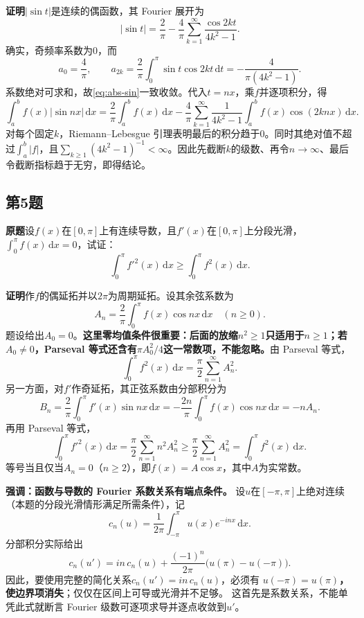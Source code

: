 \documentclass[11pt,a4paper]{ctexart}
\newcommand{\dd}{\,\mathrm d}
\newcommand{\proofstart}{\par\noindent\textbf{证明}\quad}
\begin{document}
\proofstart $|\sin t|$是连续的偶函数，其 Fourier 展开为
\begin{equation}\label{eq:abs-sin}
 |\sin t|=\frac2\pi-\frac4\pi
 \sum_{k=1}^{\infty}\frac{\cos2kt}{4k^2-1}.
\end{equation}
确实，奇频率系数为$0$，而
\[
 a_0=\frac4\pi,\qquad
 a_{2k}=\frac2\pi\int_0^\pi\sin t\cos2kt\dd t
 =-\frac4{\pi(4k^2-1)}.
\]
系数绝对可求和，故\eqref{eq:abs-sin}一致收敛。代入$t=nx$，乘$f$并逐项积分，得
\[
 \int_a^b f(x)|\sin nx|\dd x
 =\frac2\pi\int_a^b f(x)\dd x
 -\frac4\pi\sum_{k=1}^{\infty}\frac1{4k^2-1}
      \int_a^b f(x)\cos(2knx)\dd x.
\]
对每个固定$k$，Riemann--Lebesgue 引理表明最后的积分趋于$0$。同时其绝对值不超过$\int_a^b|f|$，且$\sum_{k\ge1}(4k^2-1)^{-1}<\infty$。因此先截断$k$的级数、再令$n\to\infty$、最后令截断指标趋于无穷，即得结论。

\subsection{第5题}
\noindent\textbf{原题}\quad 设$f(x)$在$[0,\pi]$上有连续导数，且$f'(x)$在$[0,\pi]$上分段光滑，$\int_0^\pi f(x)\dd x=0$，试证：
\[
 \int_0^\pi f'^2(x)\dd x\ge\int_0^\pi f^2(x)\dd x.
\]

\proofstart 作$f$的偶延拓并以$2\pi$为周期延拓。设其余弦系数为
\[
 A_n=\frac2\pi\int_0^\pi f(x)\cos nx\dd x\quad(n\ge0).
\]
题设给出$A_0=0$。\textbf{这里零均值条件很重要：后面的放缩$n^2\ge1$只适用于$n\ge1$；若$A_0\ne0$，Parseval 等式还含有$\pi A_0^2/4$这一常数项，不能忽略。}由 Parseval 等式，
\[
 \int_0^\pi f^2(x)\dd x=\frac\pi2\sum_{n=1}^{\infty}A_n^2.
\]
另一方面，对$f'$作奇延拓，其正弦系数由分部积分为
\[
 B_n=\frac2\pi\int_0^\pi f'(x)\sin nx\dd x
 =-\frac{2n}\pi\int_0^\pi f(x)\cos nx\dd x=-nA_n.
\]
再用 Parseval 等式，
\[
 \int_0^\pi f'^2(x)\dd x=\frac\pi2\sum_{n=1}^{\infty}n^2A_n^2
 \ge\frac\pi2\sum_{n=1}^{\infty}A_n^2
 =\int_0^\pi f^2(x)\dd x.
\]
等号当且仅当$A_n=0$（$n\ge2$），即$f(x)=A\cos x$，其中$A$为实常数。

\par\noindent\textbf{强调：函数与导数的 Fourier 系数关系有端点条件。}
设$u$在$[-\pi,\pi]$上绝对连续（本题的分段光滑情形满足所需条件），记
\[
 c_n(u)=\frac1{2\pi}\int_{-\pi}^{\pi}u(x)e^{-inx}\dd x.
\]
分部积分实际给出
\[
 \boxed{\displaystyle c_n(u')=in\,c_n(u)
 +\frac{(-1)^n}{2\pi}\bigl(u(\pi)-u(-\pi)\bigr).}
\]
因此，要使用完整的简化关系$c_n(u')=in\,c_n(u)$，必须有
\textbf{$u(-\pi)=u(\pi)$，使边界项消失}；仅仅在区间上可导或光滑并不足够。
这首先是系数关系，不能单凭此式就断言 Fourier 级数可逐项求导并逐点收敛到$u'$。
\end{document}
